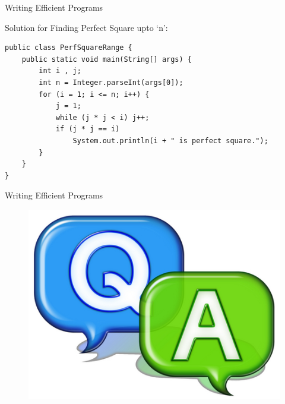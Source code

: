 \documentclass[14pt]{beamer}
\begin{document}
\begin{frame}[fragile]{Writing Efficient Programs}
 \begin{block}{Solution for Finding Perfect Square upto `n':}
  \begin{lstlisting}[numbers=none]
public class PerfSquareRange {
    public static void main(String[] args) {
        int i , j;
        int n = Integer.parseInt(args[0]);
        for (i = 1; i <= n; i++) {
            j = 1;
            while (j * j < i) j++;
            if (j * j == i) 
                System.out.println(i + " is perfect square.");
        } 
    }
}
\end{lstlisting}

 \end{block}
\end{frame}

\begin{frame}{Writing Efficient Programs}
 \begin{figure}[H]
 \begin{center}
   \includegraphics[scale=.3]{qa.png}   
 \end{center}
  \end{figure}
\end{frame}
\end{document}
